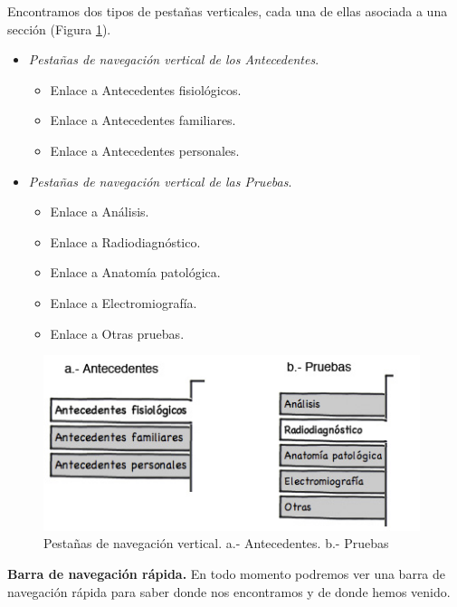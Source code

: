 \documentclass[a4paper,oneside,11pt]{book}
\begin{document}
		Encontramos dos tipos de pestañas verticales, cada una de ellas asociada a una sección (Figura \ref{fig:nav_ficha_lat1}).
		\begin{itemize}
			\item \textit{Pestañas de navegación vertical de los Antecedentes}. 
				\begin{itemize}
					\item Enlace a Antecedentes fisiológicos.
					\item Enlace a Antecedentes familiares.
					\item Enlace a Antecedentes personales.
				\end{itemize}
			\item \textit{Pestañas de navegación vertical de las Pruebas}.
				\begin{itemize}
					\item Enlace a Análisis.
					\item Enlace a Radiodiagnóstico.
					\item Enlace a Anatomía patológica.
					\item Enlace a Electromiografía.
					\item Enlace a Otras pruebas.
				\end{itemize}
		\end{itemize}
		
		\begin{figure}[H]
		  \centering
		    \includegraphics[width=11cm]{img/jpg/nav/fichamedica_lat.jpg}
		  \caption{Pestañas de navegación vertical. a.- Antecedentes. b.- Pruebas}
		  \label{fig:nav_ficha_lat1}
		\end{figure}
		
		
		\textbf{Barra de navegación rápida.} En todo momento podremos ver una barra de navegación rápida para saber donde nos encontramos y de donde hemos venido.
		
\end{document}
